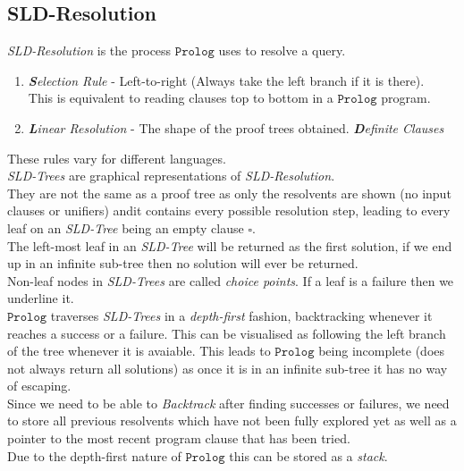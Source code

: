 \documentclass[11pt,a4paper]{article}
\begin{document}
\subsection{SLD-Resolution}

\textit{SLD-Resolution} is the process $\mathtt{Prolog}$ uses to resolve a query.
\begin{enumerate}
	\item \textit{\textbf{S}election Rule} - Left-to-right (Always take the left branch if it is there).\\
	This is equivalent to reading clauses top to bottom in a $\mathtt{Prolog}$ program.
	\item \textit{\textbf{L}inear Resolution} - The shape of the proof trees obtained.
	\textit{\textbf{D}efinite Clauses}
\end{enumerate}
\nb These rules vary for different languages.\\

\textit{SLD-Trees} are graphical representations of \textit{SLD-Resolution}.\\
They are not the same as a proof tree as only the resolvents are shown (no input clauses or unifiers) andit contains every possible resolution step, leading to every leaf on an \textit{SLD-Tree} being an empty clause $\square$.\\
The left-most leaf in an \textit{SLD-Tree} will be returned as the first solution, if we end up in an infinite sub-tree then no solution will ever be returned.\\
Non-leaf nodes in \textit{SLD-Trees} are called \textit{choice points}.
\nb If a leaf is a failure then we underline it.\\

$\mathtt{Prolog}$ traverses \textit{SLD-Trees} in a \textit{depth-first} fashion, backtracking whenever it reaches a success or a failure. This can be visualised as following the left branch of the tree whenever it is avaiable. This leads to $\mathtt{Prolog}$ being incomplete (does not always return all solutions) as once it is in an infinite sub-tree it has no way of escaping.\\

Since we need to be able to \textit{Backtrack} after finding successes or failures, we need to store all previous resolvents which have not been fully explored yet as well as a pointer to the most recent program clause that has been tried.\\
Due to the depth-first nature of $\mathtt{Prolog}$ this can be stored as a \textit{stack}.\\
\end{document}
